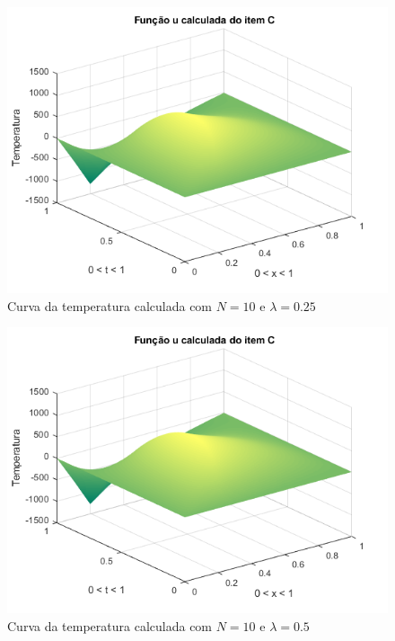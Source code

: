 \documentclass[12pt]{article}
\begin{document}
\begin{spacing}{1.5}
\begin{figure}[ht!]
    \centering
    \includegraphics[width=0.8\linewidth]{Primeira_Tarefa/ItemC/n10_lambda0-25_calc.png}
    \caption{Curva da temperatura calculada com $N=10$ e $\lambda=0.25$}
    \label{fig:C_n10lambda0-25_exata}
\end{figure}
\begin{figure}
    \centering
    \includegraphics[width=0.8\linewidth]{Primeira_Tarefa/ItemC/n10_lambda0-5_calc.png}
    \caption{Curva da temperatura calculada com $N=10$ e $\lambda=0.5$}
    \label{fig:C_n10lambda0-5_calc}
\end{figure}



\end{spacing}
\end{document}
